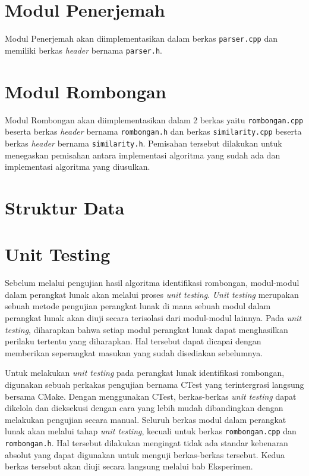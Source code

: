 \section{Modul Penerjemah}
\label{sec:impl-parser}

Modul Penerjemah akan diimplementasikan dalam berkas \texttt{parser.cpp} dan memiliki berkas \textit{header} bernama \texttt{parser.h}. 

\section{Modul Rombongan}
\label{sec:impl-rombongan}

Modul Rombongan akan diimplementasikan dalam 2 berkas yaitu \texttt{rombongan.cpp} beserta berkas \textit{header} bernama \texttt{rombongan.h} dan berkas \texttt{similarity.cpp} beserta berkas \textit{header} bernama \texttt{similarity.h}. Pemisahan tersebut dilakukan untuk menegaskan pemisahan antara implementasi algoritma yang sudah ada dan implementasi algoritma yang diusulkan.

\section{Struktur Data}
\label{sec:impl-struct}

\section{Unit Testing}
\label{sec:unit-test}

Sebelum melalui pengujian hasil algoritma identifikasi rombongan, modul-modul dalam perangkat lunak akan melalui proses \textit{unit testing}. \textit{Unit testing} merupakan sebuah metode pengujian perangkat lunak di mana sebuah modul dalam perangkat lunak akan diuji secara terisolasi dari modul-modul lainnya. Pada \textit{unit testing}, diharapkan bahwa setiap modul perangkat lunak dapat menghasilkan perilaku tertentu yang diharapkan. Hal tersebut dapat dicapai dengan memberikan seperangkat masukan yang sudah disediakan sebelumnya.

Untuk melakukan \textit{unit testing} pada perangkat lunak identifikasi rombongan, digunakan sebuah perkakas pengujian bernama CTest yang terintergrasi langsung bersama CMake. Dengan menggunakan CTest, berkas-berkas \textit{unit testing} dapat dikelola dan dieksekusi dengan cara yang lebih mudah dibandingkan dengan melakukan pengujian secara manual. Seluruh berkas modul dalam perangkat lunak akan melalui tahap \textit{unit testing}, kecuali untuk berkas \texttt{rombongan.cpp} dan \texttt{rombongan.h}. Hal tersebut dilakukan mengingat tidak ada standar kebenaran absolut yang dapat digunakan untuk menguji berkas-berkas tersebut. Kedua berkas tersebut akan diuji secara langsung melalui bab Eksperimen.